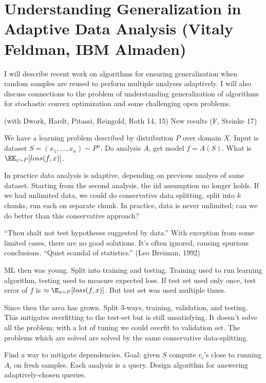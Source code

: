 \section{Understanding Generalization in Adaptive Data Analysis (Vitaly Feldman, IBM Almaden)}

I will describe recent work on algorithms for ensuring generalization when random samples are reused to perform multiple analyses adaptively. I will also discuss connections to the problem of understanding generalization of algorithms for stochastic convex optimization and some challenging open problems.


(with Dwork, Hardt, Pitassi, Reingold, Roth 14, 15) New results (F, Steinke 17)

We have a learning problem described by distribution $P$ over domain $X$. Input is dataset $S=(x_1,\ldots, x_n)\sim P^n$. Do analysis $A$, get model $f=A(S)$. 
What is $\EE_{x\sim P}[loss(f,x)]$.

In practice data analysis is adaptive, depending on previous analyes of same dataset.
Starting from the second analysis, the iid assumption no longer holds. %
If we had unlimited data, we could do conservative data splitting, split into $k$ chunks, run each on separate chunk.
In practice, data is never unlimited; can we do better than this conservative approach?

``Thou shalt not test hypotheses suggested by data.''
With exception from some limited cases, there are no good solutions. It's often ignored, causing spurious conclusions. ``Quiet scandal of statistics.'' (Leo Breiman, 1992)

ML then was young. Split into training and testing. Training used to run learning algorithm, testing used to measure expected loss. If test set used only once, test error of $f$ is $\approx \E_{x\sim P}[loss(f,x)]$. But test set was used multiple times.

Since then the area has grown. Split 3-ways, training, validation, and testing.
This mitigates overfitting to the test-set but is still unsatisfying. It doesn't solve all the problem; with a lot of tuning we could overfit to validation set. The problems which are solved are solved by the same conservative data-splitting.

Find a way to mitigate dependencies. Goal: given $S$ compute $v_i$'s close to running $A_i$ on fresh samples.
Each analysis is a query. Design algorithm for answering adaptively-chosen queries. 

